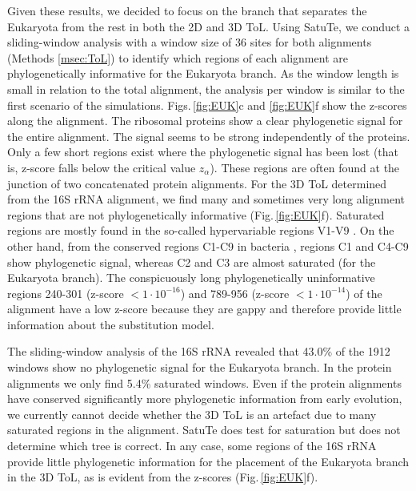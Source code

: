 Given these results, we decided to focus on the branch that separates the Eukaryota from the rest in both the 2D and 3D ToL. Using SatuTe, we conduct a sliding-window analysis with a window size of 36 sites for both alignments (Methods \ref{msec:ToL}) to identify which regions of each alignment are phylogenetically informative for the Eukaryota branch. As the window length is small in relation to the total alignment, the analysis per window is similar to the first scenario of the simulations. Figs.\,\ref{fig:EUK}c and \ref{fig:EUK}f show the z-scores along the alignment. The ribosomal proteins show a clear phylogenetic signal for the entire alignment. The signal seems to be strong  independently of the proteins. Only a few short regions exist where the phylogenetic signal has been lost (that is, z-score falls below the critical value $z_{\alpha}$). These regions are often found at the junction of two concatenated protein alignments. For the 3D ToL determined from the 16S rRNA alignment, we find many and sometimes very long alignment regions that are not phylogenetically informative (Fig.\,\ref{fig:EUK}f). Saturated regions are mostly found in the so-called hypervariable regions V1-V9 . On the other hand, from the conserved regions C1-C9 in bacteria , regions C1 and C4-C9 show phylogenetic signal, whereas C2 and C3 are almost saturated (for the Eukaryota branch). The conspicuously long phylogenetically uninformative regions 240-301 (z-score $< 1 \cdot 10^{-16}$)
and 789-956 (z-score $< 1 \cdot 10^{-14}$) of the alignment have a low z-score because they are gappy and therefore provide little information about the substitution model.

\medskip 

The sliding-window analysis of the 16S rRNA revealed that 43.0\% of the 1912 windows show no phylogenetic signal for the Eukaryota branch. In the protein alignments we only find 5.4\% saturated windows. Even if the protein alignments have conserved significantly more phylogenetic information from early evolution, we currently cannot decide whether the
3D ToL is an artefact due to many saturated regions in the alignment. SatuTe does test for saturation but does not determine which tree is correct. In any case, some regions of the 16S rRNA provide little phylogenetic information for the placement of the Eukaryota branch in the 3D ToL, as is evident from the z-scores (Fig.\,\ref{fig:EUK}f).

\medskip 

